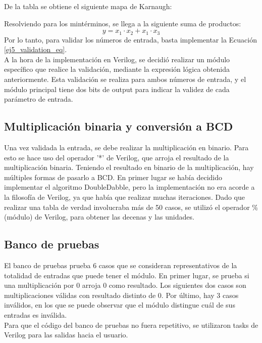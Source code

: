 
\noindent
De la tabla se obtiene el siguiente mapa de Karnaugh:



\noindent
Resolviendo para los mint\'erminos, se llega a la siguiente suma de productos: 
\begin{equation}
    y = x_1\cdot x_2 + x_1\cdot x_3
    \label{ej5_validation_eq}
\end{equation}
\noindent
Por lo tanto, para validar los n\'umeros de entrada, basta implementar la Ecuaci\'on \ref{ej5_validation_eq}. \\
A la hora de la implementaci\'on en Verilog, se decidi\'o realizar un m\'odulo espec\'ifico que realice la validaci\'on, mediante la expresi\'on l\'ogica obtenida anteriormente. Esta validaci\'on se realiza para ambos n\'umeros de entrada, y el m\'odulo principal tiene dos bits de output para indicar la validez de cada par\'ametro de entrada.
\subsection{Multiplicaci\'on binaria y conversi\'on a BCD}
\noindent
Una vez validada la entrada, se debe realizar la multiplicaci\'on en binario. Para esto se hace uso del operador '*' de Verilog, que arroja el resultado de la multiplicaci\'on binaria. Teniendo el resultado en binario de la multiplicaci\'on, hay m\'ultiples formas de pasarlo a BCD. En primer lugar se hab\'ia decidido implementar el algoritmo DoubleDabble, pero la implementaci\'on no era acorde a la filosof\'ia de Verilog, ya que hab\'ia que realizar muchas iteraciones. Dado que realizar una tabla de verdad involucraba m\'as de 50 casos, se utiliz\'o el operador \% (m\'odulo) de Verilog, para obtener las decenas y las unidades.
\subsection{Banco de pruebas}
\noindent
El banco de pruebas prueba 6 casos que se consideran representativos de la totalidad de entradas que puede tener el m\'odulo. En primer lugar, se prueba si una multiplicaci\'on por 0 arroja 0 como resultado. Los siguientes dos casos son multiplicaciones v\'alidas con resultado distinto de 0. Por \'ultimo, hay 3 casos inv\'alidos, en los que se puede observar que el m\'odulo distingue cu\'al de sus entradas es inv\'alida. \\
Para que el c\'odigo del banco de pruebas no fuera repetitivo, se utilizaron tasks de Verilog para las salidas hacia el usuario.